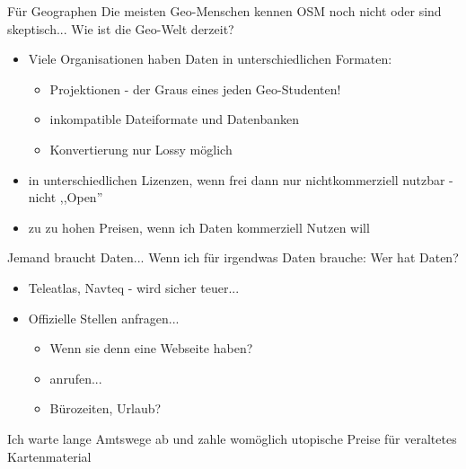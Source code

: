 \documentclass{beamer}
\begin{document}
\begin{frame}{Für Geographen}
	Die meisten Geo-Menschen kennen OSM noch nicht oder sind skeptisch...
	\pause
	\vspace{5mm}
	Wie ist die Geo-Welt derzeit?
	\pause
	\begin{itemize}
		\item Viele Organisationen haben Daten in unterschiedlichen Formaten:
			\begin{itemize}
				\item Projektionen - der Graus eines jeden Geo-Studenten!
				\item inkompatible Dateiformate und Datenbanken
				\item Konvertierung nur Lossy möglich
			\end{itemize}
		\item in unterschiedlichen Lizenzen, wenn frei dann nur nichtkommerziell nutzbar - nicht  ,,Open''
		\item zu zu hohen Preisen, wenn ich Daten kommerziell Nutzen will
	\end{itemize}
\end{frame}

\begin{frame}{Jemand braucht Daten...}
	Wenn ich für irgendwas Daten brauche:
	\vspace{5mm}
	Wer hat Daten?
	
	\begin{itemize}
		\item Teleatlas, Navteq - wird sicher teuer...
			\pause
		\item Offizielle Stellen anfragen...
			\begin{itemize}
				\item Wenn sie denn eine Webseite haben?
				\item anrufen...
				\item Bürozeiten, Urlaub?
			\end{itemize}
	\end{itemize}
	Ich warte lange Amtswege ab und zahle womöglich utopische Preise für veraltetes Kartenmaterial
\end{frame}
\end{document}
